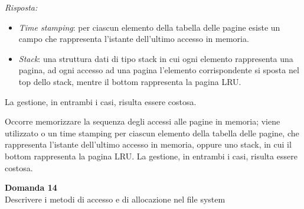 \documentclass{article}
\newenvironment{problem}[2][Domanda]
    { \begin{mdframed}[backgroundcolor=gray!20] \textbf{#1 #2} \\}
    {  \end{mdframed}}
\newenvironment{solution}
    {\textit{Risposta:}}
    {}
\begin{document}
\begin{solution}
\begin{itemize}
\begin{itemize}
      \item \emph{Time stamping}: per ciascun elemento della tabella delle pagine esiste un campo che rappresenta l’istante dell’ultimo accesso in memoria.
      \item \emph{Stack}: una struttura dati di tipo stack in cui ogni elemento rappresenta una pagina, ad ogni accesso ad una pagina l'elemento corrispondente si sposta nel top dello stack, mentre il bottom rappresenta la pagina LRU.
      \end{itemize}
La gestione, in entrambi i casi, risulta essere costosa.
\end{itemize}
Occorre memorizzare la sequenza degli accessi alle pagine in memoria; viene utilizzato o un time stamping per ciascun elemento della tabella delle pagine, che rappresenta l’istante dell’ultimo accesso in memoria, oppure uno stack, in cui il bottom rappresenta la pagina LRU.
\newline
La gestione, in entrambi i casi, risulta essere costosa.
\end{solution}
\begin{problem}{14}
Descrivere i metodi di accesso e di allocazione nel file system
\end{problem}
\end{document}
